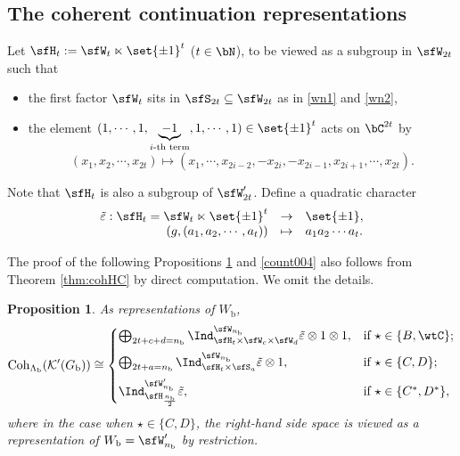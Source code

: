 \documentclass[12pt,a4paper]{amsart}
\newcommand{\Res}{\mathrm{Res}}
\def\subset{\subseteq}
\newcommand{\CK}{{\mathcal {K}}}
\numberwithin{equation}{section}
\newtheorem{prop}[thm]{Proposition}
\theoremstyle{remark}
\def\Coh{\mathrm{Coh}}
\begin{document}
\subsection{The coherent continuation representations}
 Let
$\sfH_{t} := \sfW_t\ltimes \set{\pm 1}^t$ ($t\in\bN$), to be viewed as a  subgroup in $\sfW_{2t}$ such
that
\begin{itemize}
  \item the first factor $\sfW_{t}$ sits in $\sfS_{2t}\subset \sfW_{2t}$ as in \eqref{wn1} and \eqref{wn2},
    \item the element $(1,\cdots,1, \underbrace{-1}_{i\text{-th
        term}}, 1, \cdots, 1)\in \set{\pm 1}^{t}$ acts on $\bC^{2t}$ by
        \[
        (x_{1},x_{2},\cdots, x_{2t} ) \mapsto (x_{1},\cdots, x_{2i-2}, -x_{2i},-x_{2i-1},x_{2i+1},\cdots, x_{2t}).
        \]
\end{itemize}
Note that $\sfH_{t}$ is also a subgroup of $\sfW'_{2t}$. Define a quadratic
character
\[
  \begin{array}{rcl}
    \tilde{\varepsilon} :  \sfH_{t}=  \sfW_{t}\ltimes \set{\pm 1}^{t}& \rightarrow & \set{\pm 1},\\
                                  (g,(a_{1},a_{2},\cdots, a_{t})) & \mapsto & a_{1}a_{2}\cdots a_{t}.
  \end{array}
\]







     The proof of the following Propositions \ref{count003} and \ref{count004}  also follows from Theorem \ref{thm:cohHC} by direct computation. We  omit the details.




\begin{prop}\label{count003}
As representations of $W_\mathrm b$,
    \[
       \Coh_{\Lambda_\mathrm b}(\CK'(G_\mathrm b)) \cong
        \begin{cases}
  \bigoplus_{\substack{2t+c+d=n_\mathrm b}} \Ind_{\sfH_{t} \times \sfW_{c}\times \sfW_{d}}^{\sfW_{n_\mathrm b}}
         \tilde{\varepsilon}\otimes 1\otimes 1, &  \text{if $\star \in \{B,  \wtC \}$}; \medskip\\
      \bigoplus_{\substack{2t+a=n_\mathrm b}} %
          \Ind_{\sfH_{t} \times \sfS_a}^{\sfW_{n_\mathrm b}}\tilde{\varepsilon}\otimes 1, &  \text{if $\star \in \{C, D \}$};\medskip \\
          \Ind_{\sfH_{\frac{n_\mathrm b}{2}}}^{\sfW'_{n_\mathrm b}}\tilde{\varepsilon}, &  \text{if $\star \in \{C^*, D^* \}$},
     \end{cases}
       \]
       where in the case when $\star\in \{C,D\}$, the right-hand side space is viewed as a representation of $W_\mathrm b=\sfW_{n_\mathrm b}'$ by restriction.
      \end{prop}
\end{document}

